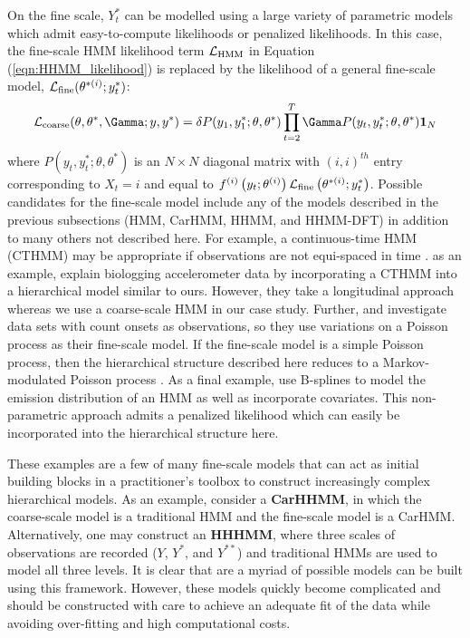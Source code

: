 On the fine scale, $Y^*_t$ can be modelled using a large variety of parametric models which admit easy-to-compute likelihoods or penalized likelihoods. In this case, the fine-scale HMM likelihood term $\mathcal{L}_{\text{HMM}}$ in Equation (\ref{eqn:HHMM_likelihood}) is replaced by the likelihood of a general fine-scale model, $\mathcal{L}_{\text{fine}}(\theta^{*(i)};y^*_t)$:
\[
\calL_{\text{coarse}}(\theta,\theta^*,\Gamma;y,y^*) = \delta P(y_1,y^*_1;\theta,\theta^*) \prod_{t=2}^T \Gamma P(y_t,y^*_t;\theta,\theta^*) \mathbf{1}_N
\]
where $P(y_t,y^*_t;\theta,\theta^*) $ is an $N \times N$ diagonal matrix with $(i,i)^{th}$ entry corresponding to $X_t=i$ and equal to $f^{(i)}\left(y_t;\theta^{(i)}\right)\mathcal{L}_{\text{fine}}\left(\theta^{*(i)};y^*_t\right)$. 
%
Possible candidates for the fine-scale model include any of the models described in the previous subsections (HMM, CarHMM, HHMM, and HHMM-DFT) in addition to many others not described here. 
For example, a continuous-time HMM (CTHMM) may be appropriate if observations are not equi-spaced in time \citep{Liu:2015}. as an example, \citet{Xu:2018} explain biologging accelerometer data by incorporating a CTHMM into a hierarchical model similar to ours. However, they take a longitudinal approach whereas we use a coarse-scale HMM in our case study.
Further, \citet{Bebbington:2007} and \citet{Borchers:2013} investigate data sets with count onsets as observations, so they use variations on a Poisson process as their fine-scale model. If the fine-scale model is a simple Poisson process, then the hierarchical structure described here reduces to a Markov-modulated Poisson process \citep{Fischer:1993}.
As a final example, \citep{Langrock:2018} use B-splines to model the emission distribution of an HMM as well as incorporate covariates. This non-parametric approach admits a penalized likelihood which can easily be incorporated into the hierarchical structure here. 

These examples are a few of many fine-scale models that can act as initial building blocks in a practitioner's toolbox to construct increasingly complex hierarchical models. As an example, consider a \textbf{CarHHMM}, in which the coarse-scale model is a traditional HMM and the fine-scale model is a CarHMM. Alternatively, one may construct an \textbf{HHHMM}, where three scales of observations are recorded ($Y$, $Y^*$, and $Y^{**}$) and traditional HMMs are used to model all three levels. It is clear that are a myriad of possible models can be built using this framework. However, these models quickly become complicated and should be constructed with care to achieve an adequate fit of the data while avoiding over-fitting and high computational costs.